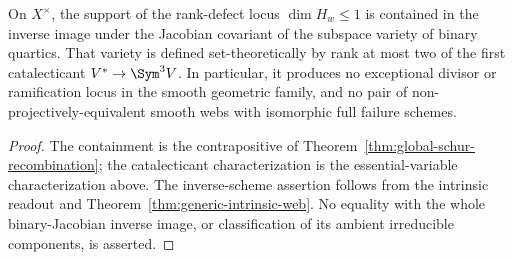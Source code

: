\begin{corollary}
\label{cor:exceptional-binary-jacobian}
On \(X^\times\), the support of the rank-defect locus
\(\dim H_w\le1\) is contained in the inverse image under the
Jacobian covariant of the subspace variety of binary quartics.  That
variety is defined set-theoretically by rank at most two of the first
catalecticant \(V^*\to\Sym^3V\).  In particular, it produces
no exceptional divisor or ramification locus in the smooth geometric
family, and no pair of non-projectively-equivalent smooth webs with
isomorphic full failure schemes.
\end{corollary}
\begin{proof}
The containment is the contrapositive of
Theorem~\ref{thm:global-schur-recombination}; the catalecticant
characterization is the essential-variable characterization above.
The inverse-scheme assertion follows from the intrinsic readout and
Theorem~\ref{thm:generic-intrinsic-web}.  No equality with the whole
binary-Jacobian inverse image, or classification of its ambient
irreducible components, is asserted.
\end{proof}
